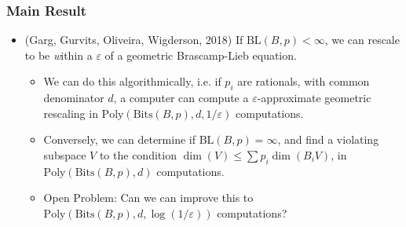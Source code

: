 \documentclass[handout,usenames,dvipsnames,12pt]{beamer}
\begin{document}
\begin{frame}
    \frametitle{Main Result}

    \begin{itemize}
        \item (Garg, Gurvits, Oliveira, Wigderson, 2018) If $\text{BL}(B,p) < \infty$, we can rescale to be {\emph within a $\varepsilon$} of a geometric Brascamp-Lieb equation.
        \begin{itemize}
            \pause
            \item We can do this algorithmically, i.e. if $p_i$ are rationals, with common denominator $d$, a computer can compute a $\varepsilon$-approximate geometric rescaling in $\text{Poly}(\text{Bits}(B,p),d,1/\varepsilon)$ computations. 

            \pause
            \item
            Conversely, we can determine if $\text{BL}(B,p) = \infty$, and find a violating subspace $V$ to the condition $\dim(V) \leq \sum p_i \dim(B_i V)$, in $\text{Poly}(\text{Bits}(B,p),d)$ computations.

            \pause
            \item Open Problem: Can we can improve this to $\text{Poly}(\text{Bits}(B,p),d,\log(1/\varepsilon))$ computations?
        \end{itemize}
    \end{itemize}
\end{frame}
\end{document}
